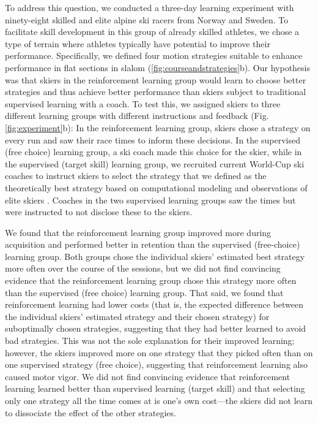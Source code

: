 \documentclass[pdflatex,sn-mathphys-num]{sn-jnl}%
\theoremstyle{thmstyleone}%
\theoremstyle{thmstyletwo}%
\theoremstyle{thmstylethree}%
\begin{document}
To address this question, we conducted a three-day learning experiment with ninety-eight skilled and elite alpine ski racers from Norway and Sweden. To facilitate skill development in this group of already skilled athletes, we chose a type of terrain where athletes typically have potential to improve their performance. Specifically, we defined four motion strategies suitable to enhance performance in flat sections in slalom  (\ref{fig:courseandstrategies}b). Our hypothesis was that skiers in the reinforcement learning group would learn to choose better strategies and thus achieve better performance than skiers subject to traditional supervised learning with a coach. To test this, we assigned skiers to three different learning groups with different instructions and feedback (Fig. \ref{fig:experiment}b): In the reinforcement learning group, skiers chose a strategy on every run and saw their race times to inform these decisions. In the supervised (free choice) learning group, a ski coach made this choice for the skier, while in the supervised (target skill) learning group, we recruited current World-Cup ski coaches to instruct skiers to select the strategy that we defined as the theoretically best strategy based on computational modeling \cite{lind_physics_2013} and observations of elite skiers \cite{reid_alpine_2020}. Coaches in the two supervised learning groups saw the times but were instructed to not disclose these to the skiers. 

We found that the reinforcement learning group improved more during acquisition and performed better in retention than the supervised (free-choice) learning group. Both groups chose the individual skiers' estimated best strategy more often over the course of the sessions, but we did not find convincing evidence that the reinforcement learning group chose this strategy more often than the supervised (free choice) learning group. That said, we found that reinforcement learning had lower costs (that is, the expected difference between the individual skiers' estimated strategy and their chosen strategy) for suboptimally chosen strategies, suggesting that they had better learned to avoid bad strategies. This was not the sole explanation for their improved learning; however, the skiers improved more on one strategy that they picked often than on one supervised strategy (free choice), suggesting that reinforcement learning also caused motor vigor. We did not find convincing evidence that reinforcement learning learned better than supervised learning (target skill) and that selecting only one strategy all the time comes at is one’s own cost—the skiers did not learn to dissociate the effect of the other strategies.
\end{document}
